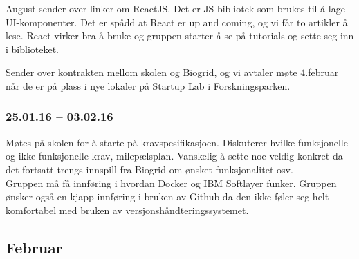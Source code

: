 \documentclass[12pt, oneside]{article}
\begin{document}
August sender over linker om ReactJS. Det er JS bibliotek som brukes til å lage UI-komponenter. Det er spådd at React er up and coming, og vi får to artikler å lese. React virker bra å bruke og gruppen starter å se på tutorials og sette seg inn i biblioteket. 

Sender over kontrakten mellom skolen og Biogrid, og vi avtaler møte 4.februar når de er på plass i nye lokaler på Startup Lab i Forskningsparken.

\subsubsection{25.01.16 -- 03.02.16}
Møtes på skolen for å starte på kravspesifikasjoen. Diskuterer hvilke funksjonelle og ikke funksjonelle krav, milepælsplan. Vanskelig å sette noe veldig konkret da det fortsatt trengs innspill fra Biogrid om ønsket funksjonalitet osv.\\
Gruppen må få innføring i hvordan Docker og IBM Softlayer funker. Gruppen ønsker også en kjapp innføring i bruken av Github da den ikke føler seg helt komfortabel med bruken av versjonshåndteringssystemet. 


\subsection{Februar}
\end{document}
